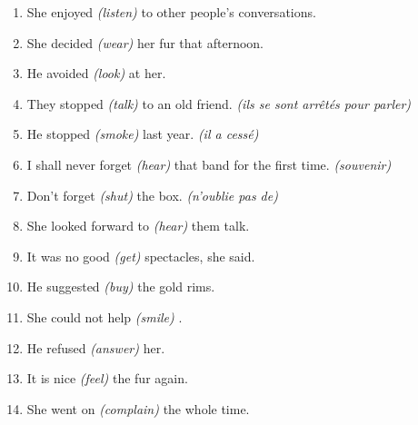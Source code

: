 \documentclass{fiche}
\begin{document}
\entete





\begin{anglais}
\begin{enumerate}[label=\arabic*.,itemsep=2.2mm,leftmargin=*]
  \item She enjoyed \emph{(listen)}  to other people's conversations.
  \item She decided \emph{(wear)}  her fur that afternoon.
  \item He avoided \emph{(look)}  at her.
  \item They stopped \emph{(talk)}  to an old friend. \emph{(ils se sont
    arrêtés pour parler)}
  \item He stopped \emph{(smoke)}  last year. \emph{(il a cessé)}
  \item I shall never forget \emph{(hear)}  that band for the first time.
    \emph{(souvenir)}
  \item Don't forget \emph{(shut)}  the box. \emph{(n'oublie pas de)}
  \item She looked forward to \emph{(hear)}  them talk.
  \item It was no good \emph{(get)}  spectacles, she said.
  \item He suggested \emph{(buy)}  the gold rims.
  \item She could not help \emph{(smile)} .
  \item He refused \emph{(answer)}  her.
  \item It is nice \emph{(feel)}  the fur again.
  \item She went on \emph{(complain)}  the whole time.
\end{enumerate}
\end{anglais}
\end{document}

